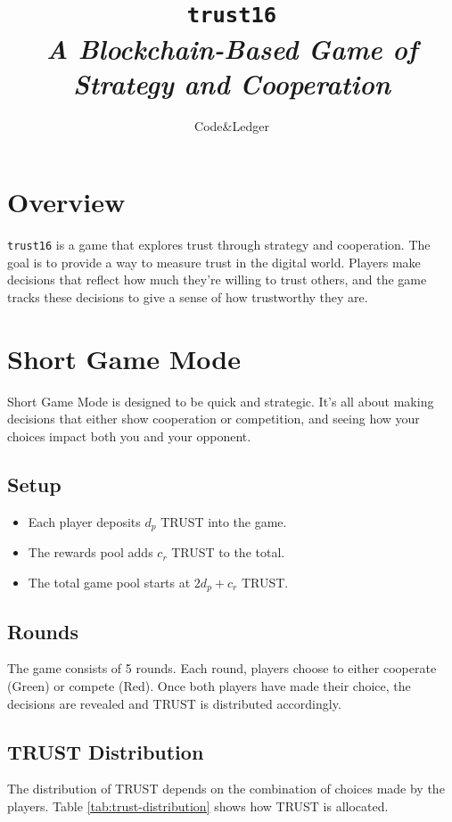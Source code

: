 \documentclass[table, twocolumn]{article}
\title{%
  \Huge \texttt{trust16} \\ \vspace{10pt}
  \small \emph{A Blockchain-Based Game of Strategy and Cooperation}
}
\author{Code\&Ledger}
\date{}
\begin{document}
\maketitle

\section{Overview} \label{sec:overview}

\texttt{trust16} is a game that explores trust through strategy and cooperation. The goal is to provide a way to measure trust in the digital world. Players make decisions that reflect how much they’re willing to trust others, and the game tracks these decisions to give a sense of how trustworthy they are.

\section{Short Game Mode} \label{sec:short-game-mode}

Short Game Mode is designed to be quick and strategic. It’s all about making decisions that either show cooperation or competition, and seeing how your choices impact both you and your opponent.

\subsection{Setup}
\begin{itemize}
    \item Each player deposits $d_p$ TRUST into the game.
    \item The rewards pool adds $c_r$ TRUST to the total.
    \item The total game pool starts at $2d_p + c_r$ TRUST.
\end{itemize}

\subsection{Rounds}
The game consists of 5 rounds. Each round, players choose to either cooperate (Green) or compete (Red). Once both players have made their choice, the decisions are revealed and TRUST is distributed accordingly.

\subsection{TRUST Distribution}
The distribution of TRUST depends on the combination of choices made by the players. Table \ref{tab:trust-distribution} shows how TRUST is allocated.
\end{document}
